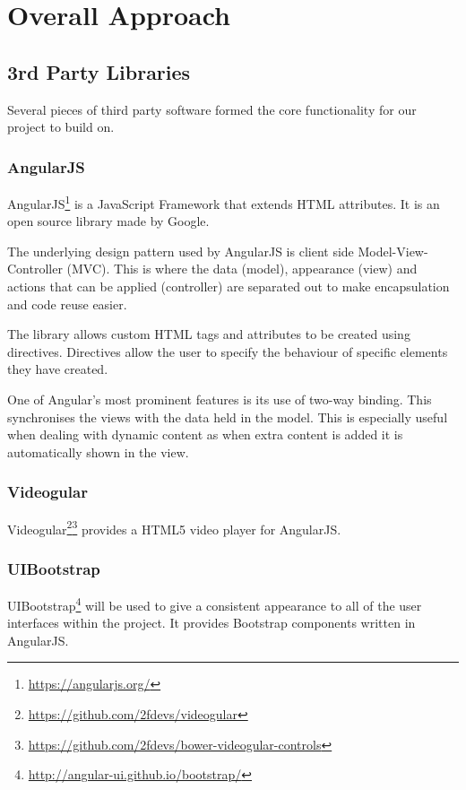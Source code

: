 \chapter{Overall Approach} 
\label{Chapter:Overall Approach}

\section{3rd Party Libraries}
Several pieces of third party software formed the core functionality for our project to build on.

\subsection{AngularJS}
\label{Section:AngularJS}
AngularJS\footnote{\url{https://angularjs.org/}} is a JavaScript Framework that extends HTML attributes. It is an open source library made by Google.

The underlying design pattern used by AngularJS is client side Model-View-Controller (MVC). This is where the data (model), appearance (view) and actions that can be applied (controller) are separated out to make encapsulation and code reuse easier. 

The library allows custom HTML tags and attributes to be created using directives. Directives allow the user to specify the behaviour of specific elements they have created.

One of Angular's most prominent features is its use of two-way binding. This synchronises the views with the data held in the model. This is especially useful when dealing with dynamic content as when extra content is added it is automatically shown in the view.

\subsection{Videogular}
\label{Section:Videogular}
Videogular\footnote{\url{https://github.com/2fdevs/videogular}}\footnote{\url{https://github.com/2fdevs/bower-videogular-controls}} provides a HTML5 video player for AngularJS.

\subsection{UIBootstrap}
\label{Section:UIBootstrap}
UIBootstrap\footnote{\url{http://angular-ui.github.io/bootstrap/}} will be used to give a consistent appearance to all of the user interfaces within the project. It provides Bootstrap components written in AngularJS.

